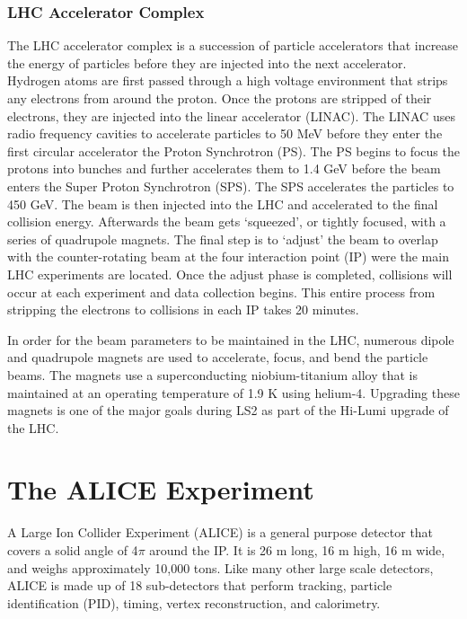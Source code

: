 \subsubsection{LHC Accelerator Complex}\label{sec:LHCop}
The LHC accelerator complex is a succession of particle accelerators that increase the energy of particles before they are injected into the next accelerator.  Hydrogen atoms are first passed through a high voltage environment that strips any electrons from around the proton.  Once the protons are stripped of their electrons, they are injected into the linear accelerator (LINAC).  The LINAC uses radio frequency cavities to accelerate particles to 50 MeV before they enter the first circular accelerator the Proton Synchrotron (PS).  The PS begins to focus the protons into bunches and further accelerates them to 1.4 GeV before the beam enters the Super Proton Synchrotron (SPS).  The SPS accelerates the particles to 450 GeV.  The beam is then injected into the LHC and accelerated to the final collision energy.  Afterwards the beam gets `squeezed', or tightly focused, with a series of quadrupole magnets.  The final step is to `adjust'  the beam to overlap with the counter-rotating beam at the four interaction point (IP) were the main LHC experiments are located.  Once the adjust phase is completed, collisions will occur at each experiment and data  collection begins.  This entire process from stripping the electrons to collisions in each IP takes 20 minutes.

In order for the beam parameters to be maintained in the LHC, numerous dipole and quadrupole magnets are used to accelerate, focus, and bend the particle beams.  The magnets use a superconducting niobium-titanium alloy that is maintained at an operating temperature of 1.9 K using helium-4.  Upgrading these magnets is one of the major goals during LS2 as part of the Hi-Lumi upgrade of the LHC\cite{Fabjan:2011jb}.


\section{The ALICE Experiment}
A Large Ion Collider Experiment (ALICE) is a general purpose detector that covers a solid angle of 4$ \pi$ around the IP.  It is 26 m long, 16 m high, 16 m wide, and weighs approximately 10,000 tons\cite{Fabjan:2011jb}.  Like many other large scale detectors, ALICE is made up of 18 sub-detectors that perform tracking, particle identification (PID), timing, vertex reconstruction, and calorimetry.  


